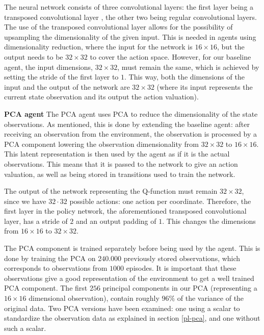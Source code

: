 The neural network consists of three convolutional layers: the first layer being a transposed convolutional layer \cite{transpose}, the other two being regular convolutional layers. The use of the transposed convolutional layer allows for the possibility of upsampling the dimensionality of the given input. This is needed in agents using dimensionality reduction, where the input for the network is $16 \times 16$, but the output needs to be $32 \times 32$ to cover the action space. However, for our baseline agent, the input dimensions, $32 \times 32$, must remain the same, which is achieved by setting the stride of the first layer to $1$. This way, both the dimensions of the input and the output of the network are $32 \times 32$ (where its input represents the current state observation and its output the action valuation).\newline

\noindent \textbf{PCA agent}\newline
\noindent The PCA agent uses PCA to reduce the dimensionality of the state observations. As mentioned, this is done by extending the baseline agent: after receiving an observation from the environment, the observation is processed by a PCA component lowering the observation dimensionality from $32 \times 32$ to $16 \times 16$. This latent representation is then used by the agent as if it is the actual observations. This means that it is passed to the network to give an action valuation, as well as being stored in transitions used to train the network.

The output of the network representing the Q-function must remain $32 \times 32$, since we have $32 \cdot 32$ possible actions: one action per coordinate. Therefore, the first layer in the policy network, the aforementioned transposed convolutional layer, has a stride of $2$ and an output padding of $1$. This changes the dimensions from $16 \times 16$ to $32 \times 32$. 

The PCA component is trained separately before being used by the agent. This is done by training the PCA on $240.000$ previously stored observations, which corresponds to observations from $1000$ episodes. It is important that these observations give a good representation of the environment to get a well trained PCA component. The first $256$ principal components in our PCA (representing a $16 \times 16$ dimensional observation), contain roughly $96\%$ of the variance of the original data. Two PCA versions have been examined: one using a scalar to standardize the observation data as explained in section \ref{pl-pca}, and one without such a scalar. %

